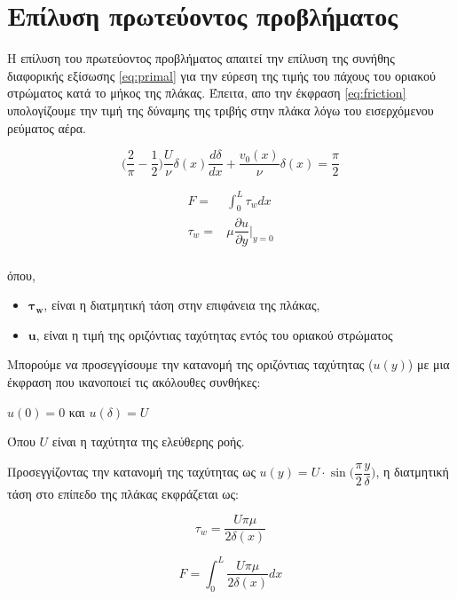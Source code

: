 \section{Επίλυση πρωτεύοντος προβλήματος}

Η επίλυση του πρωτεύοντος προβλήματος απαιτεί την επίλυση της συνήθης διαφορικής εξίσωσης \ref{eq:primal} για την εύρεση της τιμής του πάχους του οριακού στρώματος κατά το μήκος της πλάκας. Έπειτα, απο την έκφραση \ref{eq:friction} υπολογίζουμε την τιμή της δύναμης της τριβής στην πλάκα λόγω του εισερχόμενου ρεύματος αέρα. 

\begin{equation}
    \Big(\dfrac{2}{\pi} - \dfrac{1}{2} \Big)\dfrac{U}{\nu}\delta(x)\dfrac{d\delta}{dx} + \dfrac{v_0(x)}{\nu}\delta(x) = \dfrac{\pi}{2} 
    \label{eq:primal}
\end{equation}



\begin{equation}
    \begin{aligned}
        F =& \int_0^L\tau_wdx \\[10pt]
        \tau_w =& \mu\dfrac{\partial u}{\partial y}\bigg|_{y=0}\\
    \end{aligned}
\label{eq:friction}
\end{equation}

όπου, 
\begin{itemize}
\item $\mathbf{\tau_w}$, είναι η διατμητική τάση στην επιφάνεια της πλάκας,
\item $\mathbf{u}$, είναι η τιμή της οριζόντιας ταχύτητας εντός του οριακού στρώματος
\end{itemize}

Μπορούμε να προσεγγίσουμε την κατανομή της οριζόντιας ταχύτητας ($u(y)$) με μια έκφραση που ικανοποιεί τις ακόλουθες συνθήκες:

$u(0) = 0$ και $u(\delta) = U$

Όπου $U$ είναι η ταχύτητα της ελεύθερης ροής.

Προσεγγίζοντας την κατανομή της ταχύτητας ως $u(y) = U\cdot \sin{\big(\dfrac{\pi}{2}\dfrac{y}{\delta}\big)}$, η διατμητική τάση στο επίπεδο της πλάκας εκφράζεται ως:

\begin{equation}
    \tau_w = \dfrac{U \pi \mu}{2 \delta (x)}
    \label{eq:shear}
\end{equation}

\begin{equation}
    F = \int_0^L \dfrac{U \pi \mu}{2 \delta (x)} dx
    \label{eq:finalFric}
\end{equation}

